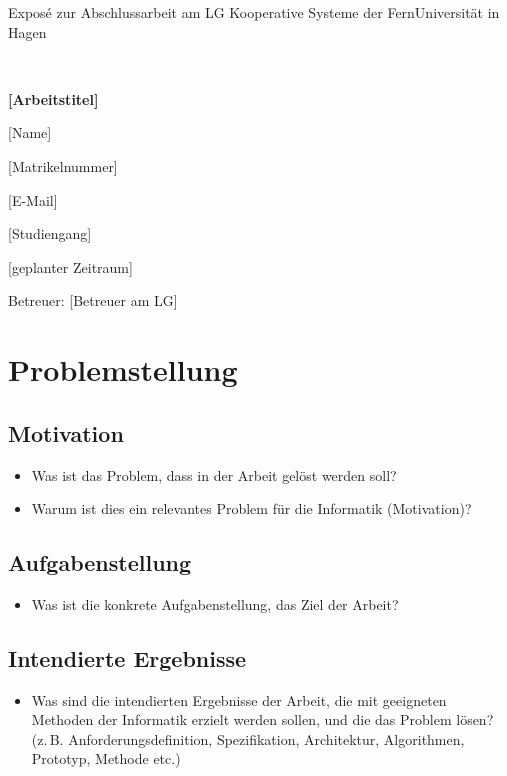 \documentclass[12pt]{article} %
\begin{document}
\begin{center}
   \baselineskip
   
   Exposé zur Abschlussarbeit am LG Kooperative Systeme der FernUniversität in Hagen
   
   ~
   
   {\LARGE\bfseries
      [Arbeitstitel]}

   \large
   [Name]
   
   [Matrikelnummer]
   
   [E-Mail]
   
   [Studiengang]
   
   [geplanter Zeitraum]
   
   Betreuer: [Betreuer am LG]
\end{center}

\section{Problemstellung}

\subsection{Motivation}
\begin{itemize}
\item Was ist das Problem, dass in der Arbeit gelöst werden soll?
\item Warum ist dies ein relevantes Problem für die Informatik (Motivation)?
\end{itemize}

\subsection{Aufgabenstellung}
\begin{itemize}
\item Was ist die konkrete Aufgabenstellung, das Ziel der Arbeit?
\end{itemize}

\subsection{Intendierte Ergebnisse}
\begin{itemize}
\item Was sind die intendierten Ergebnisse der Arbeit, die mit geeigneten Methoden
der Informatik erzielt werden sollen, und die das Problem lösen?
(z.\,B. Anforderungsdefinition, Spezifikation, Architektur, Algorithmen, Prototyp, Methode etc.)
\end{itemize}
\end{document}
